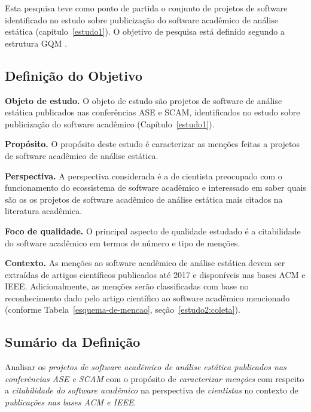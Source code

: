 Esta pesquisa teve como ponto de partida
o conjunto de projetos de software identificado
no estudo sobre publicização do software acadêmico de análise estática (capítulo~\ref{estudo1}).
O objetivo de pesquisa está definido segundo a estrutura GQM \cite{basili1994goal}.

\subsection{Definição do Objetivo}

\begin{description}
  \item{\bf Objeto de estudo.}
    O objeto de estudo são projetos de software de análise estática
    publicados nas conferências ASE e SCAM, identificados no estudo sobre
    publicização do software acadêmico (Capítulo~\ref{estudo1}).
  \item{\bf Propósito.}
    O propósito deste estudo é caracterizar as menções feitas a projetos de
    software acadêmico de análise estática.
  \item{\bf Perspectiva.}
    A perspectiva considerada é a de cientista preocupado com o funcionamento
    do ecossistema de software acadêmico e interessado em saber quais são os
    os projetos de software acadêmico de análise estática mais citados na
    literatura acadêmica.
  \item{\bf Foco de qualidade.}
    O principal aspecto de qualidade estudado é a citabilidade
    \cite{smith2016software} do software acadêmico em termos de número e tipo
    de menções.
  \item{\bf Contexto.}
    As menções ao software acadêmico de análise estática devem ser extraídas de
    artigos científicos publicados até 2017 e disponíveis nas bases ACM e
    IEEE. Adicionalmente, as menções serão classificadas com base no
    reconhecimento dado pelo artigo científico ao software acadêmico mencionado
    (conforme Tabela~\ref{esquema-de-mencao},  seção~\ref{estudo2:coleta}).
\end{description}

\subsection{Sumário da Definição}

Analisar os \textit{projetos de software acadêmico de análise estática publicados nas conferências ASE e SCAM}
com o propósito de \textit{caracterizar menções}
com respeito a \textit{citabilidade do software acadêmico}
na perspectiva de \textit{cientistas}
no contexto de \textit{publicações nas bases ACM e IEEE}.

